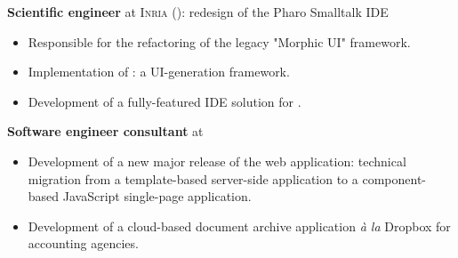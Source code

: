\begin{rubric}{
}



\textbf{Scientific engineer} at \textsc{Inria} (): redesign of the Pharo
Smalltalk IDE

\begin{itemize}
    \item Responsible for the refactoring of the legacy "Morphic UI" framework.
    \item Implementation of : a UI-generation framework.
    \item Development of a fully-featured IDE solution for .
\end{itemize}





 \textbf{Software engineer consultant} at 

\begin{itemize}
\item Development of a new major release of the web
  application: technical migration from a template-based server-side application to a component-based JavaScript single-page application.
\item Development of a cloud-based document archive application \emph{à la} Dropbox for
  accounting agencies.
\end{itemize}


\end{rubric}
